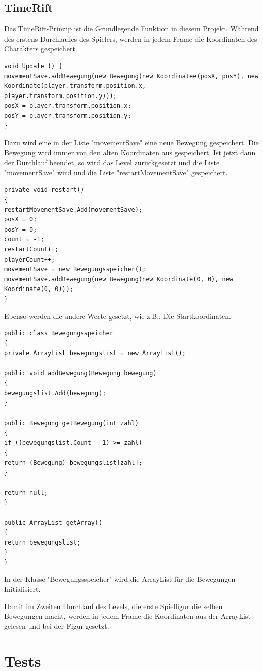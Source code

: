 \section{TimeRift}
Das TimeRift-Prinzip ist die Grundlegende Funktion in diesem Projekt. Während des erstens Durchlaufes des Spielers, werden in jedem Frame die Koordinaten des Charakters gespeichert.
\begin{lstlisting}[language={[Sharp]C}, caption=TimeRift-Script]
void Update () {
movementSave.addBewegung(new Bewegung(new Koordinatee(posX, posY), new Koordinate(player.transform.position.x, player.transform.position.y)));
posX = player.transform.position.x;
posY = player.transform.position.y;
}
\end{lstlisting}
Dazu wird eine in der Liste "movementSave" eine neue Bewegung gespeichert. Die Bewegung wird immer von den alten Koordinaten aus gespeichert. Ist jetzt dann der Durchlauf beendet, so wird das Level zurückgesetzt und die Liste "movementSave" wird und die Liste "restartMovementSave" gespeichert.
\begin{lstlisting}[language={[Sharp]C}, caption=TimeRift-Restart]
private void restart()
{
restartMovementSave.Add(movementSave);
posX = 0;
posY = 0;
count = -1;
restartCount++;
playerCount++;
movementSave = new Bewegungsspeicher();
movementSave.addBewegung(new Bewegung(new Koordinate(0, 0), new Koordinate(0, 0)));
}
\end{lstlisting}
Ebenso werden die andere Werte gesetzt, wie z.B.: Die Startkoordinaten.
\begin{lstlisting}[language={[Sharp]C}, caption=TimeRift-Bewegungsspeicher]
public class Bewegungsspeicher
{
private ArrayList bewegungslist = new ArrayList();

public void addBewegung(Bewegung bewegung)
{
bewegungslist.Add(bewegung);
}

public Bewegung getBewegung(int zahl)
{
if ((bewegungslist.Count - 1) >= zahl)
{
return (Bewegung) bewegungslist[zahl];
}

return null;
}

public ArrayList getArray()
{
return bewegungslist;
}
}
\end{lstlisting}
In der Klasse "Bewegungsspeicher" wird die ArrayList für die Bewegungen Initialisiert.

Damit im Zweiten Durchlauf des Levels, die erste Spielfigur die selben Bewegungen macht, werden in jedem Frame die Koordinaten aus der ArrayList gelesen und bei der Figur gesetzt.

\chapter{Tests}

